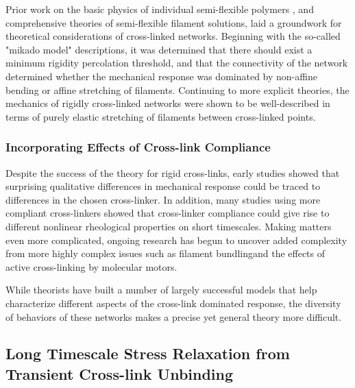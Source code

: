 \documentclass[pre,preprint]{revtex4-1}
\begin{document}
Prior work on the basic physics of individual semi-flexible polymers \cite{mol_wlc,theo_doi_ed}, and comprehensive theories of semi-flexible filament solutions, \cite{theo_morse} laid a groundwork for theoretical considerations of cross-linked networks. Beginning with the so-called "mikado model" descriptions\cite{theo_hlm,theo_hlm2}, it was determined that there should exist a minimum rigidity percolation threshold, and that the connectivity of the network determined whether the mechanical response was dominated by non-affine bending or affine stretching of filaments.   Continuing to more explicit theories\cite{theo_best}, the mechanics of rigidly cross-linked networks were shown to be well-described in terms of purely elastic stretching of filaments between cross-linked points.  

\subsubsection{Incorporating Effects of Cross-link Compliance}

Despite the success of the theory for rigid cross-links, early studies showed that surprising qualitative differences in mechanical response could be traced to differences in the chosen cross-linker\cite{rheo_crosslinkcompare,rheo_crosslinkreview}.  In addition, many studies using more compliant cross-linkers showed that cross-linker compliance could give rise to different nonlinear rheological properties on short timescales\cite{rheo_crosslink_nonlin1,rheo_crosslink_nonlin2,rheo_crosslink_nonlin3,rheo_crosslink_notactin}. Making matters even more complicated, ongoing research has begun to uncover added complexity from more highly complex issues such as filament bundling\cite{theo_crosslinkslip2,model_massive}and the effects of active cross-linking by molecular motors\cite{rheo_active}.

While theorists have built a number of largely successful models that help characterize different aspects of the cross-link dominated response\cite{theo_nonaffine2,theo_floppy,theo_crosslinknonlinear}, the diversity of behaviors of these networks makes a precise yet general theory more difficult.

\subsection{Long Timescale Stress Relaxation from Transient Cross-link Unbinding}
\end{document}
